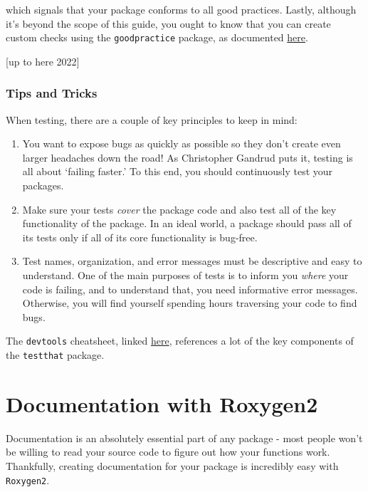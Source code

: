 \documentclass[
]{book}
\providecommand{\tightlist}{%
  \setlength{\itemsep}{0pt}\setlength{\parskip}{0pt}}
\begin{document}
which signals that your package conforms to all good practices. Lastly, although it's beyond the scope of this guide, you ought to know that you can create custom checks using the \texttt{goodpractice} package, as documented \href{https://github.com/MangoTheCat/goodpractice/blob/master/vignettes/custom_checks.Rmd}{here}.

{[}up to here 2022{]}

\hypertarget{tips-and-tricks}{%
\subsection{Tips and Tricks}\label{tips-and-tricks}}

When testing, there are a couple of key principles to keep in mind:

\begin{enumerate}
\def\labelenumi{\arabic{enumi}.}
\tightlist
\item
  You want to expose bugs as quickly as possible so they don't create even larger headaches down the road! As Christopher Gandrud puts it, testing is all about `failing faster.' To this end, you should continuously test your packages.
\item
  Make sure your tests \emph{cover} the package code and also test all of the key functionality of the package. In an ideal world, a package should pass all of its tests only if all of its core functionality is bug-free.
\item
  Test names, organization, and error messages must be descriptive and easy to understand. One of the main purposes of tests is to inform you \emph{where} your code is failing, and to understand that, you need informative error messages. Otherwise, you will find yourself spending hours traversing your code to find bugs.
\end{enumerate}

The \texttt{devtools} cheatsheet, linked \href{https://www.rstudio.com/wp-content/uploads/2015/03/devtools-cheatsheet.pdf}{here}, references a lot of the key components of the \texttt{testthat} package.

\hypertarget{documentation-with-roxygen2}{%
\chapter{Documentation with Roxygen2}\label{documentation-with-roxygen2}}

Documentation is an absolutely essential part of any package - most people won't be willing to read your source code to figure out how your functions work. Thankfully, creating documentation for your package is incredibly easy with \texttt{Roxygen2}.
\end{document}
